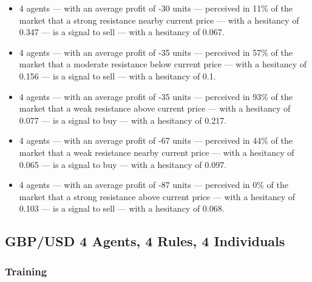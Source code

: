 {\small
  \begin{itemize}
  \item 4 agents — with an average profit of -30 units — perceived in 11\% of
    the market that a strong resistance nearby current price — with a hesitancy
    of 0.347 — is a signal to sell — with a hesitancy of 0.067.
  \item 4 agents — with an average profit of -35 units — perceived in 57\% of
    the market that a moderate resistance below current price — with a hesitancy
    of 0.156 — is a signal to sell — with a hesitancy of 0.1.
  \item 4 agents — with an average profit of -35 units — perceived in 93\% of
    the market that a weak resistance above current price — with a hesitancy of
    0.077 — is a signal to buy — with a hesitancy of 0.217.
  \item 4 agents — with an average profit of -67 units — perceived in 44\% of
    the market that a weak resistance nearby current price — with a hesitancy of
    0.065 — is a signal to buy — with a hesitancy of 0.097.
  \item 4 agents — with an average profit of -87 units — perceived in 0\% of the
    market that a strong resistance above current price — with a hesitancy of
    0.103 — is a signal to sell — with a hesitancy of 0.068.
  \end{itemize}
}





\subsection{GBP/USD 4 Agents, 4 Rules, 4 Individuals}
\label{}

\subsubsection{Training}
\label{}


